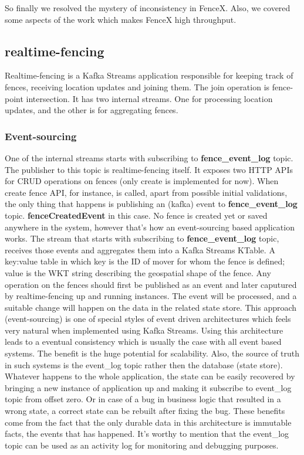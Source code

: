\documentclass[a4]{report}
\begin{document}
        So finally we resolved the mystery of inconsistency in FenceX. Also, we covered some aspects of the work which
        makes FenceX high throughput.

        \subsection{realtime-fencing}
        Realtime-fencing is a Kafka Streams application responsible for keeping track of fences, receiving location updates
        and joining them.
        The join operation is fence-point intersection.
        It has two internal streams.
        One for processing location updates, and the other is for aggregating fences.

        \subsubsection{Event-sourcing}
        One of the internal streams starts with subscribing to \textbf{fence\_event\_log} topic.
        The publisher to this topic is realtime-fencing itself.
        It exposes two HTTP APIs for CRUD operations on fences (only create is implemented for now).
        When create fence API, for instance, is called, apart from possible initial validations, the
        only thing that happens is publishing an (kafka) event to \textbf{fence\_event\_log} topic.
        \textbf{fenceCreatedEvent} in this case.
        No fence is created yet or saved anywhere in the system, however that's how an event-sourcing based application
        works.
        The stream that starts with subscribing to \textbf{fence\_event\_log} topic, receives those events and aggregates
        them into a Kafka Streams KTable.
        A key:value table in which key is the ID of mover for whom the fence is defined;
        value is the WKT string describing the geospatial shape of the fence.
        Any operation on the fences should first be published as an event and later caputured by realtime-fencing up and
        running instances.
        The event will be processed, and a suitable change will happen on the data in the related state store.
        This approach (event-sourcing) is one of special styles of event driven architectures which feels very natural
        when implemented using Kafka Streams.
        Using this architecture leads to a eventual consistency which is usually the case with all event based systems.
        The benefit is the huge potential for scalability.
        Also, the source of truth in such systems is the event\_log topic rather then the database (state store).
        Whatever happens to the whole application, the state can be easily recovered by bringing a new instance of
        application up and making it subscribe to event\_log topic from offset zero.
        Or in case of a bug in business logic that resulted in a wrong state, a correct state can be rebuilt after fixing
        the bug.
        These benefits come from the fact that the only durable data in this architecture is immutable facts, the
        events that has happened.
        It's worthy to mention that the event\_log topic can be used as an activity log for monitoring and debugging purposes.
\end{document}
